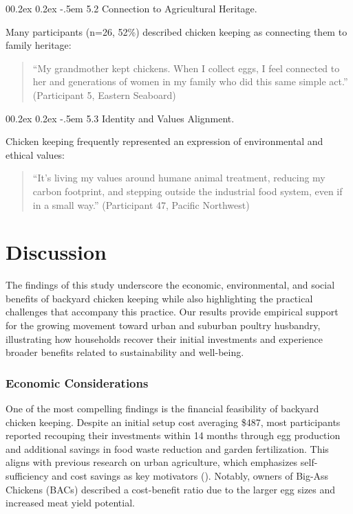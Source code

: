 \documentclass[
  man,
  floatsintext,
  longtable,
  nolmodern,
  notxfonts,
  notimes,
  colorlinks=true,linkcolor=blue,citecolor=blue,urlcolor=blue]{apa7}
\makeatletter
\renewcommand{\paragraph}{\@startsection{paragraph}{4}{\parindent}%
	{0\baselineskip \@plus 0.2ex \@minus 0.2ex}%
	{-.5em}%
	{\normalfont\normalsize\bfseries\typesectitle}}
\makeatother
\begin{document}
\paragraph{5.2 Connection to Agricultural
Heritage.}\label{connection-to-agricultural-heritage}

Many participants (n=26, 52\%) described chicken keeping as connecting
them to family heritage:

\begin{quote}
``My grandmother kept chickens. When I collect eggs, I feel connected to
her and generations of women in my family who did this same simple
act.'' (Participant 5, Eastern Seaboard)
\end{quote}

\paragraph{5.3 Identity and Values
Alignment.}\label{identity-and-values-alignment}

Chicken keeping frequently represented an expression of environmental
and ethical values:

\begin{quote}
``It's living my values around humane animal treatment, reducing my
carbon footprint, and stepping outside the industrial food system, even
if in a small way.'' (Participant 47, Pacific Northwest)
\end{quote}

\section{Discussion}\label{discussion}

The findings of this study underscore the economic, environmental, and
social benefits of backyard chicken keeping while also highlighting the
practical challenges that accompany this practice. Our results provide
empirical support for the growing movement toward urban and suburban
poultry husbandry, illustrating how households recover their initial
investments and experience broader benefits related to sustainability
and well-being.

\subsubsection{Economic Considerations}\label{economic-considerations}

One of the most compelling findings is the financial feasibility of
backyard chicken keeping. Despite an initial setup cost averaging \$487,
most participants reported recouping their investments within 14 months
through egg production and additional savings in food waste reduction
and garden fertilization. This aligns with previous research on urban
agriculture, which emphasizes self-sufficiency and cost savings as key
motivators (). Notably, owners of Big-Ass Chickens (BACs) described a
cost-benefit ratio due to the larger egg sizes and increased meat yield
potential.
\end{document}

